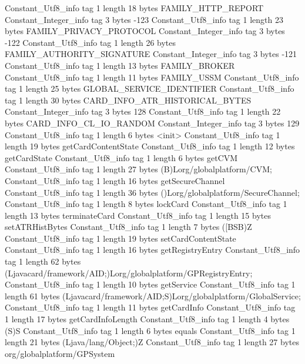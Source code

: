 {{{		}
		Constant_Utf8_info {
			tag	1
			length	18
			bytes	FAMILY_HTTP_REPORT
		}
		Constant_Integer_info {
			tag	3
			bytes	-123
		}
		Constant_Utf8_info {
			tag	1
			length	23
			bytes	FAMILY_PRIVACY_PROTOCOL
		}
		Constant_Integer_info {
			tag	3
			bytes	-122
		}
		Constant_Utf8_info {
			tag	1
			length	26
			bytes	FAMILY_AUTHORITY_SIGNATURE
		}
		Constant_Integer_info {
			tag	3
			bytes	-121
		}
		Constant_Utf8_info {
			tag	1
			length	13
			bytes	FAMILY_BROKER
		}
		Constant_Utf8_info {
			tag	1
			length	11
			bytes	FAMILY_USSM
		}
		Constant_Utf8_info {
			tag	1
			length	25
			bytes	GLOBAL_SERVICE_IDENTIFIER
		}
		Constant_Utf8_info {
			tag	1
			length	30
			bytes	CARD_INFO_ATR_HISTORICAL_BYTES
		}
		Constant_Integer_info {
			tag	3
			bytes	128
		}
		Constant_Utf8_info {
			tag	1
			length	22
			bytes	CARD_INFO_CL_IO_RANDOM
		}
		Constant_Integer_info {
			tag	3
			bytes	129
		}
		Constant_Utf8_info {
			tag	1
			length	6
			bytes	<init>
		}
		Constant_Utf8_info {
			tag	1
			length	19
			bytes	getCardContentState
		}
		Constant_Utf8_info {
			tag	1
			length	12
			bytes	getCardState
		}
		Constant_Utf8_info {
			tag	1
			length	6
			bytes	getCVM
		}
		Constant_Utf8_info {
			tag	1
			length	27
			bytes	(B)Lorg/globalplatform/CVM;
		}
		Constant_Utf8_info {
			tag	1
			length	16
			bytes	getSecureChannel
		}
		Constant_Utf8_info {
			tag	1
			length	36
			bytes	()Lorg/globalplatform/SecureChannel;
		}
		Constant_Utf8_info {
			tag	1
			length	8
			bytes	lockCard
		}
		Constant_Utf8_info {
			tag	1
			length	13
			bytes	terminateCard
		}
		Constant_Utf8_info {
			tag	1
			length	15
			bytes	setATRHistBytes
		}
		Constant_Utf8_info {
			tag	1
			length	7
			bytes	([BSB)Z
		}
		Constant_Utf8_info {
			tag	1
			length	19
			bytes	setCardContentState
		}
		Constant_Utf8_info {
			tag	1
			length	16
			bytes	getRegistryEntry
		}
		Constant_Utf8_info {
			tag	1
			length	62
			bytes	(Ljavacard/framework/AID;)Lorg/globalplatform/GPRegistryEntry;
		}
		Constant_Utf8_info {
			tag	1
			length	10
			bytes	getService
		}
		Constant_Utf8_info {
			tag	1
			length	61
			bytes	(Ljavacard/framework/AID;S)Lorg/globalplatform/GlobalService;
		}
		Constant_Utf8_info {
			tag	1
			length	11
			bytes	getCardInfo
		}
		Constant_Utf8_info {
			tag	1
			length	17
			bytes	getCardInfoLength
		}
		Constant_Utf8_info {
			tag	1
			length	4
			bytes	(S)S
		}
		Constant_Utf8_info {
			tag	1
			length	6
			bytes	equals
		}
		Constant_Utf8_info {
			tag	1
			length	21
			bytes	(Ljava/lang/Object;)Z
		}
		Constant_Utf8_info {
			tag	1
			length	27
			bytes	org/globalplatform/GPSystem
}}}
